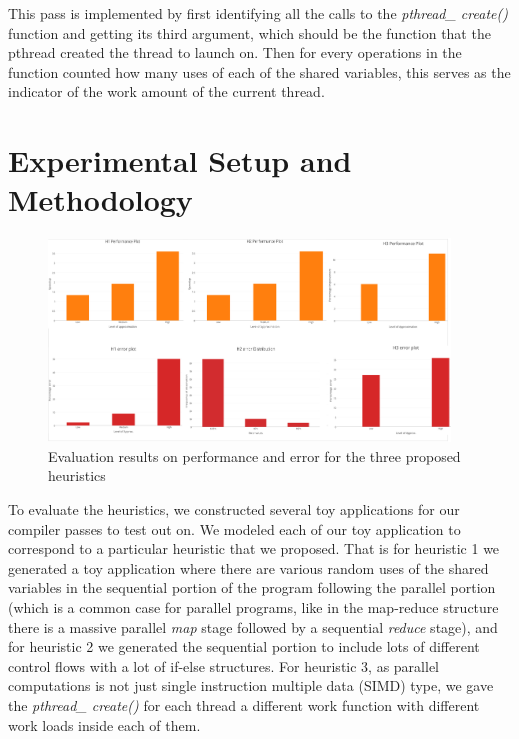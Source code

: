\documentclass[12pt,conference]{IEEEtran}
\begin{document}
This pass is implemented by first identifying all the calls to the 
\textit{pthread\_ create()} function and getting its third argument, which should
be the function that the pthread created the thread to launch on. Then for every
operations in the function counted how many uses of each of the shared 
variables, this serves as the indicator of the work amount of the current thread.



\section{Experimental Setup and Methodology} \label{sec:setup}

\begin{figure}[h]
    \centering
    \includegraphics[width=0.95\textwidth]{result.png}
    \caption{Evaluation results on performance and error for the three proposed heuristics}
    \label{fig:result}
\end{figure}

To evaluate the heuristics, we constructed several toy applications for our compiler 
passes to test out on. We modeled each of our toy application to correspond to a
particular heuristic that we proposed. That is for heuristic 1 we generated a toy
application where there are various random uses of the shared variables in the
sequential portion of the program following the parallel portion (which is a
common case for parallel programs, like in the map-reduce structure there is
a massive parallel \emph{map} stage followed by a sequential \emph{reduce} stage),
and for heuristic 2 we generated the sequential portion to include lots of different
control flows with a lot of if-else structures. For heuristic 3, as parallel
computations is not just single instruction multiple data (SIMD) type, we gave 
the \textit{pthread\_ create()} for each thread a different work function
with different work loads inside each of them.
\end{document}
